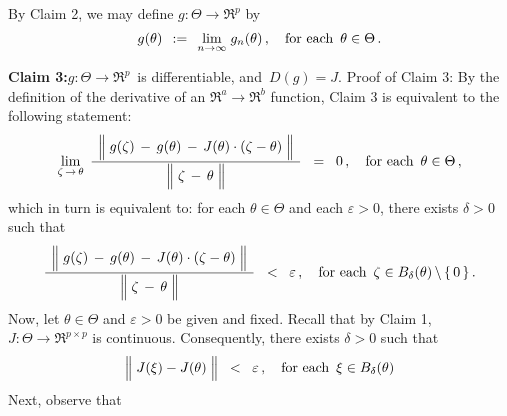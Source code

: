 \vskip 0.8cm
\noindent
By Claim 2, we may define $g : \Theta \longrightarrow \Re^{p}$ by
\begin{equation*}
g(\theta)
\;\, := \;\,
	\underset{n\rightarrow\infty}{\lim}\; g_{n}(\theta)\,,
\quad
\textnormal{for each \,$\theta \in \Theta$}\,.
\end{equation*}

\vskip 0.8cm
\noindent
\textbf{Claim 3:}\quad $g : \Theta \longrightarrow \Re^{p}$\, is differentiable, and \,$D(g) = J$.
\vskip 0.1cm
\noindent
Proof of Claim 3:\quad
By the definition of the derivative of an $\Re^{a} \longrightarrow \Re^{b}$ function,
Claim 3 is equivalent to the following statement:
\begin{equation*}
\underset{\zeta\,\rightarrow\,\theta}{\lim}\;\,
\dfrac{
	{\color{white}.}
	\left\Vert\;
		g(\zeta) \, \overset{{\color{white}.}}{-} \, g(\theta) \, - \, J(\theta)\cdot(\zeta - \theta)
		\;\right\Vert
	{\color{white}.}
	}{
	\left\Vert\;
		\zeta \, \overset{{\color{white}.}}{-} \, \theta
		\;\right\Vert
	}
\;\; = \;\;
	0\,,
\quad
\textnormal{for each \,$\theta \in \Theta$}\,,
\end{equation*}
which in turn is equivalent to:
for each $\theta \in \Theta$ and each $\varepsilon > 0$,
there exists $\delta > 0$ such that
\begin{equation*}
\dfrac{
	{\color{white}.}
	\left\Vert\;
		g(\zeta) \, \overset{{\color{white}.}}{-} \, g(\theta) \, - \, J(\theta)\cdot(\zeta - \theta)
		\;\right\Vert
	{\color{white}.}
	}{
	\left\Vert\;
		\zeta \, \overset{{\color{white}.}}{-} \, \theta
		\;\right\Vert
	}
\;\; < \;\;
	\varepsilon\,,
\quad
\textnormal{for each \,$\zeta \in B_{\delta}(\theta)\,\backslash\,\{\,0\,\}$}\,.
\end{equation*}
Now, let $\theta \in \Theta$ and $\varepsilon > 0$ be given and fixed.
Recall that by Claim 1, $J : \Theta \longrightarrow \Re^{p \times p}$ is continuous.
Consequently, there exists $\delta > 0$ such that
\begin{equation*}
\left\Vert\; J(\xi) \overset{{\color{white}.}}{-} J(\theta) \;\right\Vert
\;\; < \;\;
	\varepsilon\,,
\quad
\textnormal{for each \,$\xi \in B_{\delta}(\theta)$}
\end{equation*}
Next, observe that
